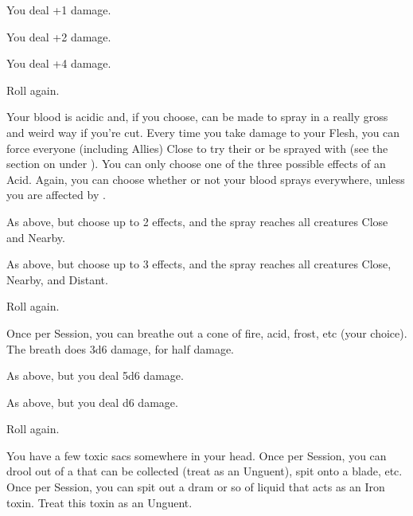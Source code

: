 \newpage
\begin{multicols*}{2}\raggedcolumns
{}





\NC[Name=Anklebiter]

 You deal +1 damage.

 You deal +2 damage.

 You deal +4 damage.

 Roll again.


\NC[Name=Bad Blood]

 Your blood is acidic and, if you choose, can be made to spray in a really gross and weird way if you're cut. Every time you take damage to your Flesh, you can force everyone (including Allies) Close to try their  or be sprayed with  (see the section on  under ). You can only choose one of the three possible effects of an Acid. Again, you can choose whether or not your blood sprays everywhere, unless you are affected by .

 As above, but choose up to 2 effects, and the spray reaches all creatures Close and Nearby.


 As above, but choose up to 3 effects, and the spray reaches all creatures Close, Nearby, and Distant.


 Roll again.


\cbreak

\NC[Name=Bad Breath]

 Once per Session, you can breathe out a cone of fire, acid, frost, etc (your choice).  The breath does 3d6 damage,  for half damage.

 As above, but you deal 5d6 damage.

 As above, but you deal \LVL d6 damage.

 Roll again.


\NC[Name=Bad Spit]

 You have a few toxic sacs somewhere in your head. Once per Session, you can drool out  of a  that can be collected (treat as an Unguent), spit onto a blade, etc.   Once per Session, you can spit out a dram or so of liquid that acts as an Iron toxin.  Treat this toxin as an Unguent.


\end{multicols*}
